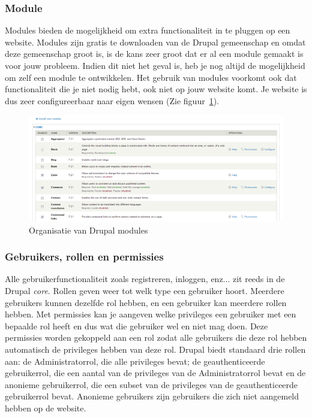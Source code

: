 \subsubsection{Module}
Modules bieden de mogelijkheid om extra functionaliteit in te pluggen op een website. Modules zijn gratis te downloaden van de Drupal gemeenschap en omdat deze gemeenschap groot is, is de kans zeer groot dat er al een module gemaakt is voor jouw probleem. Indien dit niet het geval is, heb je nog altijd de mogelijkheid om zelf een module te ontwikkelen. Het gebruik van modules voorkomt ook dat functionaliteit die je niet nodig hebt, ook niet op jouw website komt. Je website is dus zeer configureerbaar naar eigen wensen (Zie figuur~\ref{fig:drupalOrganizeModules}).
\begin{figure}[h]
\includegraphics[width=1\textwidth]{fig/drupalOrganizeModules}
\caption{Organisatie van Drupal modules}
\label{fig:drupalOrganizeModules}
\end{figure}

\subsubsection{Gebruikers, rollen en permissies}
Alle gebruikerfunctionaliteit zoals registreren, inloggen, enz... zit reeds in de Drupal \textit{core}. Rollen geven weer tot welk type een gebruiker hoort. Meerdere gebruikers kunnen dezelfde rol hebben, en een gebruiker kan meerdere rollen hebben. Met permissies kan je aangeven welke privileges een gebruiker met een bepaalde rol heeft en dus wat die gebruiker wel en niet mag doen. Deze permissies worden gekoppeld aan een rol zodat alle gebruikers die deze rol hebben automatisch de privileges hebben van deze rol. Drupal biedt standaard drie rollen aan: de Administratorrol, die alle privileges bevat; de geauthenticeerde gebruikerrol, die een aantal van de privileges van de Administratorrol bevat en de anonieme gebruikerrol, die een subset van de privileges van de geauthenticeerde gebruikerrol bevat. Anonieme gebruikers zijn gebruikers die zich niet aangemeld hebben op de website.

